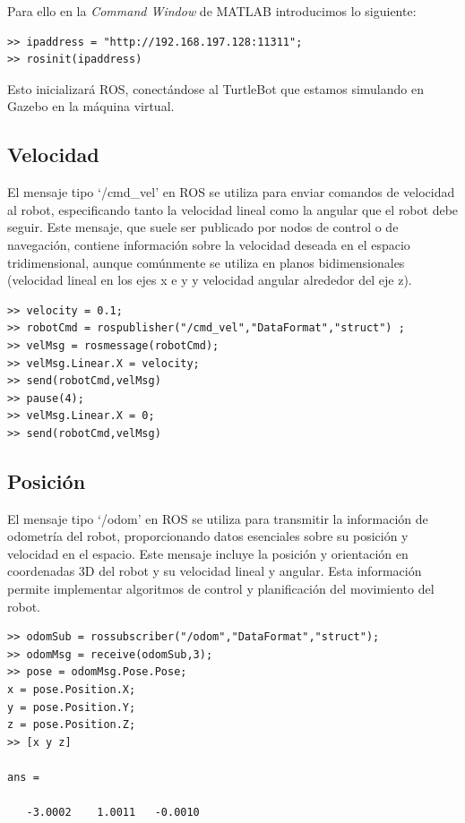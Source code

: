 Para ello en la \textit{Command Window} de MATLAB introducimos lo siguiente:

\begin{lstlisting}[basicstyle=\scriptsize]
>> ipaddress = "http://192.168.197.128:11311";
>> rosinit(ipaddress)
\end{lstlisting}

Esto inicializará ROS, conectándose al TurtleBot que estamos simulando en Gazebo en la máquina virtual.

\subsection{Velocidad}

El mensaje tipo `/cmd\_vel' en ROS se utiliza para enviar comandos de velocidad al robot, especificando tanto la velocidad lineal como la angular que el robot debe seguir. Este mensaje, que suele ser publicado por nodos de control o de navegación, contiene información sobre la velocidad deseada en el espacio tridimensional, aunque comúnmente se utiliza en planos bidimensionales (velocidad lineal en los ejes x e y y velocidad angular alrededor del eje z).

\begin{lstlisting}[basicstyle=\scriptsize]
>> velocity = 0.1;
>> robotCmd = rospublisher("/cmd_vel","DataFormat","struct") ;
>> velMsg = rosmessage(robotCmd);
>> velMsg.Linear.X = velocity;
>> send(robotCmd,velMsg)
>> pause(4);
>> velMsg.Linear.X = 0;
>> send(robotCmd,velMsg)
\end{lstlisting}

\subsection{Posición}

El mensaje tipo `/odom' en ROS se utiliza para transmitir la información de odometría del robot, proporcionando datos esenciales sobre su posición y velocidad en el espacio. Este mensaje incluye la posición y orientación en coordenadas 3D del robot y su velocidad lineal y angular. Esta información permite implementar algoritmos de control y planificación del movimiento del robot.

\begin{lstlisting}[basicstyle=\scriptsize]
>> odomSub = rossubscriber("/odom","DataFormat","struct");
>> odomMsg = receive(odomSub,3);
>> pose = odomMsg.Pose.Pose;
x = pose.Position.X;
y = pose.Position.Y;
z = pose.Position.Z;
>> [x y z]

ans =

   -3.0002    1.0011   -0.0010
\end{lstlisting}

